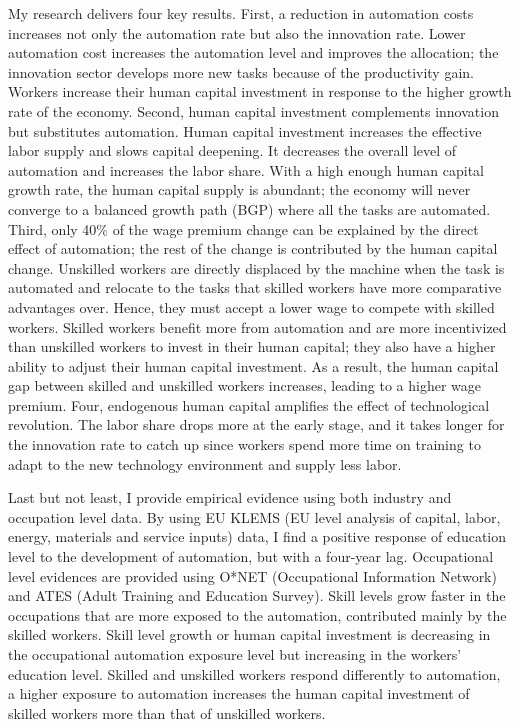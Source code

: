 \documentclass[12pt]{article}
\begin{document}
My research delivers four key results. First, a reduction in automation costs increases not only the automation rate but also the innovation rate. Lower automation cost increases the automation level and improves the allocation; the innovation sector develops more new tasks because of the productivity gain. Workers increase their human capital investment in response to the higher growth rate of the economy. Second, human capital investment complements innovation but substitutes automation. Human capital investment increases the effective labor supply and slows capital deepening. It decreases the overall level of automation and increases the labor share. With a high enough human capital growth rate, the human capital supply is abundant; the economy will never converge to a balanced growth path (BGP) where all the tasks are automated. Third, only 40\% of the wage premium change can be explained by the direct effect of automation; the rest of the change is contributed by the human capital change. Unskilled workers are directly displaced by the machine when the task is automated and relocate to the tasks that skilled workers have more comparative advantages over. Hence, they must accept a lower wage to compete with skilled workers. Skilled workers benefit more from automation and are more incentivized than unskilled workers to invest in their human capital; they also have a higher ability to adjust their human capital investment. As a result, the human capital gap between skilled and unskilled workers increases, leading to a higher wage premium. Four, endogenous human capital amplifies the effect of technological revolution. The labor share drops more at the early stage, and it takes longer for the innovation rate to catch up since workers spend more time on training to adapt to the new technology environment and supply less labor. 

Last but not least, I provide empirical evidence using both industry and occupation level data. By using EU KLEMS (EU level analysis of capital, labor, energy, materials and service inputs) data, I find a positive response of education level to the development of automation, but with a four-year lag. Occupational level evidences are provided using O*NET (Occupational Information Network) and ATES (Adult Training and Education Survey). Skill levels grow faster in the occupations that are more exposed to the automation, contributed mainly by the skilled workers. Skill level growth or human capital investment is decreasing in the occupational automation exposure level but increasing in the workers' education level. Skilled and unskilled workers respond differently to automation, a higher exposure to automation increases the human capital investment of skilled workers more than that of unskilled workers. 
\end{document}
